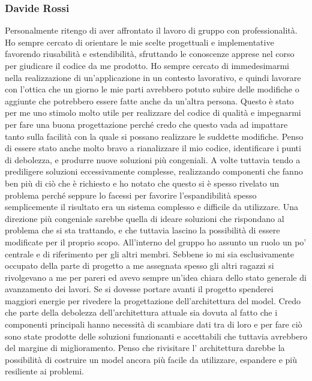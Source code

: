 \subsubsection{Davide Rossi}
Personalmente ritengo di aver affrontato il lavoro di gruppo con professionalità. 
Ho sempre cercato di orientare le mie scelte progettuali e implementative favorendo riusabilità e estendibilità, 
sfruttando le conoscenze apprese nel corso per giudicare il codice da me prodotto.
Ho sempre cercato di immedesimarmi nella realizzazione di un’applicazione in un contesto lavorativo, 
e quindi lavorare con l’ottica che un giorno le mie parti avrebbero potuto subire delle modifiche 
o aggiunte che potrebbero essere fatte anche da un’altra persona. 
Questo è stato per me uno stimolo molto utile per realizzare del codice di qualità e impegnarmi 
per fare una buona progettazione perché credo che questo vada ad impattare tanto sulla facilità 
con la quale si possano realizzare le suddette modifiche. 
Penso di essere stato anche molto bravo a rianalizzare il mio codice, 
identificare i punti di debolezza, e produrre nuove soluzioni più congeniali. 
A volte tuttavia tendo a prediligere soluzioni eccessivamente complesse, 
realizzando componenti che fanno ben più di ciò che è richiesto e ho notato che 
questo si è spesso rivelato un problema perché seppure lo facessi per favorire 
l’espandibilità spesso semplicemente il risultato era un sistema complesso e difficile 
da utilizzare. 
Una direzione più congeniale sarebbe quella di ideare soluzioni che rispondano al 
problema che si sta trattando, e che tuttavia lascino la possibilità di essere modificate 
per il proprio scopo. 
All’interno del gruppo ho assunto un ruolo un po’ centrale e di riferimento per gli 
altri membri. Sebbene io mi sia esclusivamente occupato della parte di progetto a me 
assegnata spesso gli altri ragazzi si rivolgevano a me per pareri ed avevo sempre 
un’idea chiara dello stato generale di avanzamento dei lavori. 
Se si dovesse portare avanti il progetto spenderei maggiori energie per rivedere 
la progettazione dell’architettura del model. Credo che parte della debolezza 
dell’architettura attuale sia dovuta al fatto che i componenti principali hanno 
necessità di scambiare dati tra di loro e per fare ciò  sono state prodotte delle 
soluzioni funzionanti e accettabili che tuttavia avrebbero del margine di miglioramento. 
Penso che rivisitare l’ architettura darebbe la possibilità di costruire un model 
ancora più facile da utilizzare, espandere e più resiliente ai problemi.
